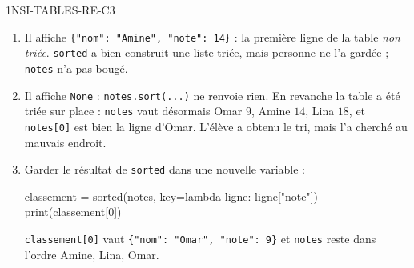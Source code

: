 \begin{corrige}{1NSI-TABLES-RE-C3}
\begin{enumerate}
  \item Il affiche \lstinline|{"nom": "Amine", "note": 14}| : la première ligne de la table
        \emph{non triée}. \lstinline{sorted} a bien construit une liste triée, mais personne
        ne l'a gardée ; \lstinline{notes} n'a pas bougé.
  \item Il affiche \lstinline{None} : \lstinline{notes.sort(...)} ne renvoie rien. En
        revanche la table a été triée sur place : \lstinline{notes} vaut désormais Omar $9$,
        Amine $14$, Lina $18$, et \lstinline{notes[0]} est bien la ligne d'Omar. L'élève a
        obtenu le tri, mais l'a cherché au mauvais endroit.
  \item Garder le résultat de \lstinline{sorted} dans une nouvelle variable :
\begin{python}
classement = sorted(notes, key=lambda ligne: ligne["note"])
print(classement[0])
\end{python}
        \lstinline{classement[0]} vaut \lstinline|{"nom": "Omar", "note": 9}| et
        \lstinline{notes} reste dans l'ordre Amine, Lina, Omar.
\end{enumerate}
\end{corrige}
